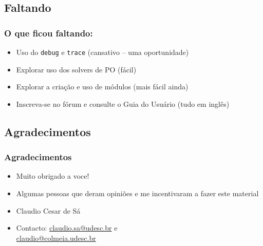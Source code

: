
\subsection{Faltando}
\begin{frame}[fragile]

    \frametitle{O que ficou faltando:}

    \begin{itemize}
      \item Uso do \texttt{debug} e \texttt{trace} (cansativo -- uma oportunidade)
      \pause
      \item Explorar uso dos solvers de PO (fácil)

      \pause
      \item Explorar a criação e  uso de módulos  (mais fácil ainda)

      \pause
      \item Inscreva-se no fórum e consulte o Guia do Usuário (tudo em inglês)


    \end{itemize}
\end{frame}


\subsection{Agradecimentos}
\begin{frame}[fragile]

    \frametitle{Agradecimentos}

    \begin{itemize}
      \item Muito obrigado a voce!
      \pause
      \item Algumas pessoas que deram opiniões e me incentivaram a 
            fazer este material
  
      \pause
      \item Claudio Cesar de Sá
     \item Contacto: \url{claudio.sa@udesc.br} e\\
           \url{claudio@colmeia.udesc.br}

    \end{itemize}
\end{frame}
